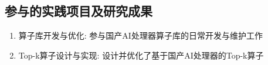 
\begin{publications}

\section*{参与的实践项目及研究成果}

\begin{enumerate}
\item {算子库开发与优化}:
    参与国产AI处理器算子库的日常开发与维护工作
\item {Top-k算子设计与实现}:
    设计并优化了基于国产AI处理器的Top-k算子
\end{enumerate}

\end{publications}
